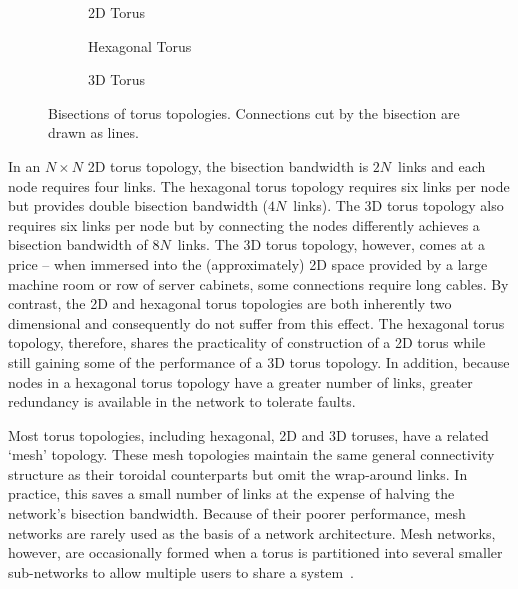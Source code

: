 		\begin{figure}
			\center
			\begin{subfigure}[b]{0.3\linewidth}
				\center
				
				\caption{2D Torus}
				\label{fig:bisection-bandwidth-2d}
			\end{subfigure}
			\begin{subfigure}[b]{0.3\linewidth}
				\center
				
				\caption{Hexagonal Torus}
				\label{fig:bisection-bandwidth-hex}
			\end{subfigure}
			\begin{subfigure}[b]{0.3\linewidth}
				\center
				
				\caption{3D Torus}
				\label{fig:bisection-bandwidth-3d}
			\end{subfigure}
			
			\caption[Bisections of torus topologies.]%
			{Bisections of torus topologies. Connections cut by the bisection
			are drawn as lines.}
			\label{fig:bisection-bandwidth}
		\end{figure}
		
		In an $N \times N$ 2D torus topology, the bisection bandwidth is $2N$~links
		and each node requires four links. The hexagonal torus topology requires
		six links per node but provides double bisection bandwidth ($4N$~links).
		The 3D torus topology also requires six links per node but by connecting
		the nodes differently achieves a bisection bandwidth of $8N$~links.  The 3D
		torus topology, however, comes at a price -- when immersed into the
		(approximately) 2D space provided by a large machine room or row of server
		cabinets, some connections require long cables. By contrast, the 2D and
		hexagonal torus topologies are both inherently two dimensional and
		consequently do not suffer from this effect. The hexagonal torus topology,
		therefore, shares the practicality of construction of a 2D torus while
		still gaining some of the performance of a 3D torus topology. In addition,
		because nodes in a hexagonal torus topology have a greater number of links,
		greater redundancy is available in the network to tolerate faults.
		
		Most torus topologies, including hexagonal, 2D and 3D toruses, have a
		related `mesh' topology. These mesh topologies maintain the same general
		connectivity structure as their toroidal counterparts but omit the
		wrap-around links. In practice, this saves a small number of links at the
		expense of halving the network's bisection bandwidth.  Because of their
		poorer performance, mesh networks are rarely used as the basis of a network
		architecture. Mesh networks, however, are occasionally formed when a torus
		is partitioned into several smaller sub-networks to allow multiple users to
		share a system~\cite{spalloc16}.
		
